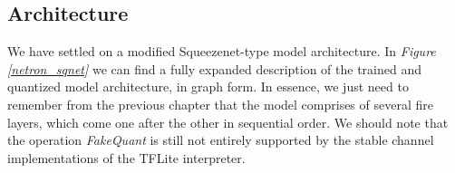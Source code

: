 \subsection{Architecture}
We have settled on a modified Squeezenet-type model architecture. In \textit{Figure \ref{netron_sqnet}} we can find a fully expanded description of the trained and quantized model architecture, in graph form. In essence, we just need to remember from the previous chapter that the model comprises of several fire layers, which come one after the other in sequential order. We should note that the operation \textit{FakeQuant} is still not entirely supported by the stable channel implementations of the TFLite interpreter.

\begin{figure}[!tbp]
\centering
{}
\end{figure}
